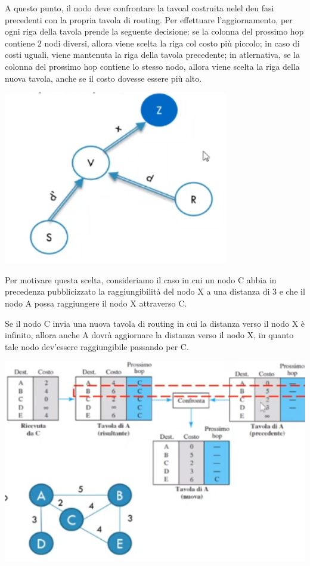             \vspace{3mm}
            
            A questo punto, il nodo deve confrontare la tavoal costruita nelel deu fasi precedenti con la propria tavola di routing. Per effettuare l'aggiornamento, per ogni riga della tavola prende la seguente decisione: se la colonna del prossimo hop contiene 2 nodi diversi, allora viene scelta la riga col costo più piccolo; in caso di costi uguali, viene mantenuta la riga della tavola precedente; in atlernativa, se la colonna del prossimo hop contiene lo stesso nodo, allora viene scelta la riga della nuova tavola, anche se il costo dovesse essere più alto.
            
            \begin{center}
                \includegraphics[scale=0.5]{images/Vector3.png}
            \end{center}
            
            Per motivare questa scelta, consideriamo il caso in cui un nodo C abbia in precedenza pubblicizzato la raggiungibilità del nodo X a una distanza di 3 e che il nodo A possa raggiungere il nodo X attraverso C.
            
            Se il nodo C invia una nuova tavola di routing in cui la distanza verso il nodo X è infinito, allora anche A dovrà aggiornare la distanza verso il nodo X, in quanto tale nodo dev'essere raggiungibile passando per C.
            
            \begin{center}
                \includegraphics[scale=0.5]{images/Vector4.png}
            \end{center}
            
